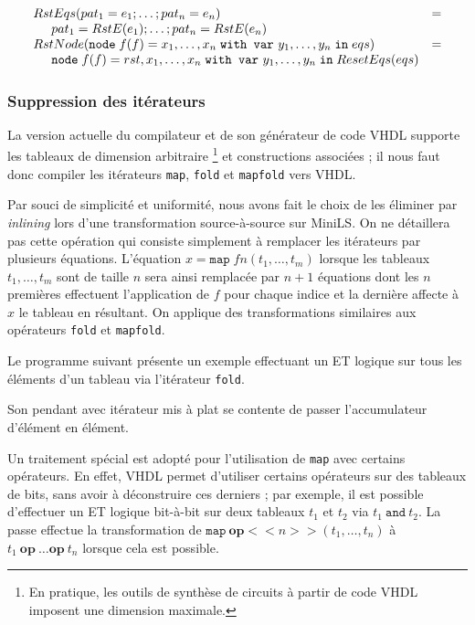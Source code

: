 \documentclass[a4paper]{article}
\newcommand{\mybox}[1]{\mbox{\tt{#1}}}
\newcommand{\ind}[0]{\hspace{0.5cm}}
\newcommand{\Node}[4]{\mybox{node} \; f(#1) = #2 \; \mybox{with var} \
  #3 \; \mybox{in} \; #4}
\newcommand{\Map}[3]{\mathtt{map} \; #1 n (#2,\dots,#3)}
\begin{document}
\[
\begin{array}{ll}
  RstEqs(pat_1 = e_1;\dots;pat_n = e_n) & = \\
  \ind pat_1 = \re{e_1};\dots;pat_n = \re{e_n} \\
  \rstn{\Node{f}{x_1,\dots,x_n}{y_1,\dots,y_n}{eqs}} & = \\
  \ind \Node{f}{rst,x_1,\dots,x_n}{y_1,\dots,y_n}{ResetEqs(eqs)}
\end{array}
\]

\subsubsection{Suppression des it\'erateurs}

La version actuelle du compilateur et de son g\'en\'erateur de code VHDL supporte
les tableaux de dimension arbitraire \footnote{En pratique, les outils de
  synth\`ese de circuits \`a partir de code VHDL imposent une dimension maximale.}
et constructions associ\'ees ; il nous faut donc compiler les it\'erateurs
\texttt{map}, \texttt{fold} et \texttt{mapfold} vers VHDL.

Par souci de simplicit\'e et uniformit\'e, nous avons fait le choix de les \'eliminer
par \textit{inlining} lors d'une transformation source-\`a-source sur MiniLS. On
ne d\'etaillera pas cette op\'eration qui consiste simplement \`a remplacer les
it\'erateurs par plusieurs \'equations. L'\'equation $x = \Map{f}{t_1}{t_m}$ lorsque
les tableaux $t_1, \dots, t_m$ sont de taille $n$ sera ainsi remplac\'ee par $n +
1$ \'equations dont les $n$ premi\`eres effectuent l'application de $f$ pour chaque
indice et la derni\`ere affecte \`a $x$ le tableau en r\'esultant. On applique des
transformations similaires aux op\'erateurs \texttt{fold} et \texttt{mapfold}.

Le programme suivant pr\'esente un exemple effectuant un ET logique sur tous les
\'el\'ements d'un tableau via l'it\'erateur \texttt{fold}.



Son pendant avec it\'erateur mis \`a plat se contente de passer l'accumulateur
d'\'el\'ement en \'el\'ement.



Un traitement spécial est adopté pour l'utilisation de \texttt{map} avec
certains opérateurs. En effet, VHDL permet d'utiliser certains opérateurs sur
des tableaux de bits, sans avoir à déconstruire ces derniers ; par exemple, il
est possible d'effectuer un ET logique bit-à-bit sur deux tableaux $t_1$ et
$t_2$ via $t_1 \ \texttt{and} \ t_2$. La passe effectue la transformation de
$\texttt{map}\ \textbf{op}<<n>>(t_1,\dots,t_n)$ à $t_1\ \textbf{op}\ \dots
\textbf{op}\ t_n$ lorsque cela est possible.
\end{document}
